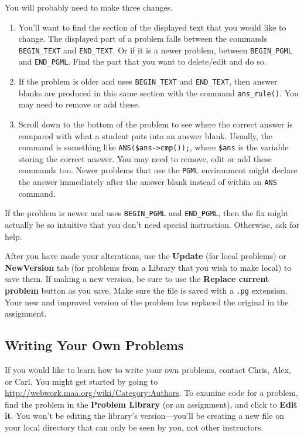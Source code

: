 \documentclass[12pt]{article}
\newcommand{\menu}[1]{\textbf{#1}}
\begin{document}
You will probably need to make three changes.  
\begin{enumerate}
\item You'll want to find the section of the displayed text that you would like to change.  The displayed part of a problem falls between the commands \verb=BEGIN_TEXT= and \verb=END_TEXT=. Or if it is a newer problem, between  \verb=BEGIN_PGML= and \verb=END_PGML=. Find the part that you want to delete/edit and do so.

\item If the problem is older and uses \verb=BEGIN_TEXT= and \verb=END_TEXT=, then answer blanks are produced in this same section with the command \verb=ans_rule()=.  You may need to remove or add these.

\item Scroll down to the bottom of the problem to see where the correct answer is compared with what a student puts into an answer blank.  Usually, the command is something like \verb=ANS($ans->cmp());=, where \verb=$ans= is the variable storing the correct answer.  You may need to remove, edit or add these commands too. Newer problems that use the \texttt{PGML} environment might declare the answer immediately after the answer blank instead of within an \texttt{ANS} command.
\end{enumerate}
If the problem is newer and uses \verb=BEGIN_PGML= and \verb=END_PGML=, then the fix might actually be so intuitive that you don't need special instruction. Otherwise, ask for help.

After you have made your alterations, use the \menu{Update} (for local problems) or \menu{NewVersion} tab (for problems from a Library that you wish to make local) to save them. If making a new version, be sure to use the \menu{Replace current problem} button as you save. Make sure the file is saved with a \texttt{.pg} extension.  Your new and improved version of the problem has replaced the original in the assignment.

\subsection{Writing Your Own Problems}
If you would like to learn how to write your own problems, contact Chris, Alex, or Carl.  You might get started by going to \url{http://webwork.maa.org/wiki/Category:Authors}.  To examine code for a problem, find the problem in the \menu{Problem Library} (or an assignment), and click to \menu{Edit it}.  You won't be editing the library's version---you'll be creating a new file on your local directory that can only be seen by you, not other instructors.
\end{document}

